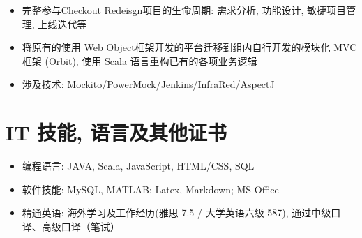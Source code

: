 \documentclass{resume}
\begin{document}
\begin{itemize}
    \item {完整参与Checkout Redeisgn项目的生命周期: 需求分析, 功能设计, 敏捷项目管理, 上线迭代等}
    \item
    {将原有的使用 Web Object框架开发的平台迁移到组内自行开发的模块化 MVC 框架 (Orbit), 使用 Scala 语言重构已有的各项业务逻辑}
    \item {涉及技术: Mockito/PowerMock/Jenkins/InfraRed/AspectJ}
\end{itemize}



\section{IT 技能, 语言及其他证书}
\begin{itemize}[parsep=0.5ex]
  \item 编程语言: JAVA, Scala, JavaScript, HTML/CSS, SQL
  \item 软件技能: MySQL, MATLAB; Latex, Markdown; MS Office
  \item 精通英语: 海外学习及工作经历(雅思 7.5 / 大学英语六级 587), 通过中级口译、高级口译（笔试）
\end{itemize}


%
%
\end{document}

